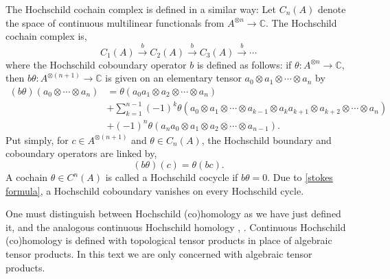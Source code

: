     The Hochschild cochain complex is defined in a similar way: Let $C_n(A)$ denote the space of continuous multilinear functionals from $A^{\otimes n} \to \mathbb{C}$. The Hochschild cochain complex is,
    \begin{equation*}
        C_1(A)\xrightarrow{b} C_2(A)\xrightarrow{b} C_3(A) \xrightarrow{b} \cdots
    \end{equation*}
    where the Hochschild coboundary operator $b$ is defined as follows: if $\theta:A^{\otimes n}\to \mathbb{C}$, then $b\theta:A^{\otimes (n+1)}\to \mathbb{C}$
    is given on an elementary tensor $a_0\otimes a_1\otimes\cdots \otimes a_n$ by
    \begin{align*}
        (b\theta)(a_0\otimes\cdots\otimes a_n)&=\theta(a_0a_1\otimes a_2\otimes\cdots\otimes a_n)\\
        &+\sum_{k=1}^{n-1}(-1)^k\theta(a_0\otimes a_1\otimes\cdots \otimes a_{k-1}\otimes a_ka_{k+1}\otimes a_{k+2}\otimes\cdots\otimes a_n)\\
        &+(-1)^n\theta(a_na_0\otimes a_1\otimes a_2\otimes\cdots\otimes a_{n-1}).
    \end{align*}
    Put simply, for $c \in A^{\otimes (n+1)}$ and $\theta \in C_n(A)$, the Hochschild boundary and coboundary operators are linked by,
    \begin{equation}\label{stokes formula}
        (b\theta)(c) = \theta(bc).
    \end{equation}
    A cochain $\theta \in C^n(A)$ is called a Hochschild cocycle if $b\theta = 0$. Due to \eqref{stokes formula}, a Hochschild coboundary
    vanishes on every Hochschild cycle.    
%     
%     
%     
    \begin{rem}
        One must distinguish between Hochschild (co)homology as we have just defined it, and the analogous continuous Hochschild homology \cite[Section 8.5]{GVF}, \cite{Pflaum-continuous-hh-1998}. Continuous Hochschild (co)homology is defined with topological tensor products in place of algebraic tensor products. In this text we are only concerned with algebraic tensor products.
    \end{rem}
    
